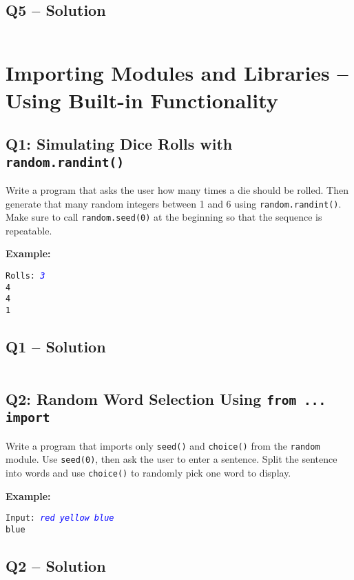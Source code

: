 \documentclass[a4paper,11pt]{article}
\begin{document}
\subsection*{Q5 – Solution}
\inputminted{python}{Files/5/5.py}


\section{Importing Modules and Libraries – Using Built-in Functionality}

\subsection*{Q1: Simulating Dice Rolls with \texttt{random.randint()}}
Write a program that asks the user how many times a die should be rolled. Then generate that many random integers between 1 and 6 using \texttt{random.randint()}. Make sure to call \texttt{random.seed(0)} at the beginning so that the sequence is repeatable.

\textbf{Example:}
\begin{flushleft}
	\texttt{Rolls: \textcolor{blue}{\textit{3}}}\\
	\texttt{4\\4\\1}
\end{flushleft}

\subsection*{Q1 – Solution}
\inputminted{python}{Files/6/1.py}

\subsection*{Q2: Random Word Selection Using \texttt{from ... import}}
Write a program that imports only \texttt{seed()} and \texttt{choice()} from the \texttt{random} module. Use \texttt{seed(0)}, then ask the user to enter a sentence. Split the sentence into words and use \texttt{choice()} to randomly pick one word to display.

\textbf{Example:}
\begin{flushleft}
	\texttt{Input: \textcolor{blue}{\textit{red yellow blue}}}\\
	\texttt{blue}
\end{flushleft}

\subsection*{Q2 – Solution}
\inputminted{python}{Files/6/2.py}
\end{document}
